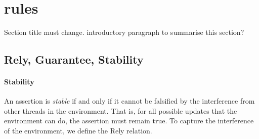 \section{\colosl rules}
\todo Section title must change.
\todo introductory paragraph to summarise this section?
%
\subsection{Rely, Guarantee, Stability}
%
%
\paragraph{Stability}
An assertion is \emph{stable} if and only if it cannot be falsified by the interference from other threads in the environment. That is, for all possible updates that the environment can do, the assertion must remain true. To capture the interference of the environment, we define the Rely relation.
%
%

